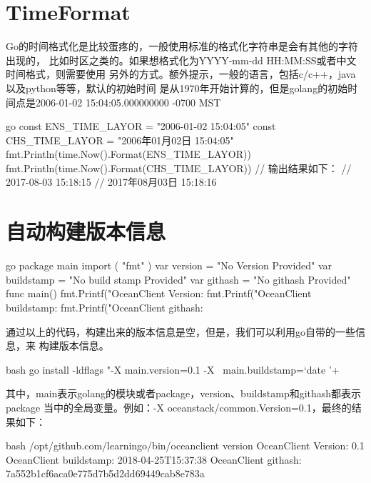 \section{TimeFormat}
Go的时间格式化是比较蛋疼的，一般使用标准的格式化字符串是会有其他的字符出现的，
比如时区之类的。如果想格式化为YYYY-mm-dd HH:MM:SS或者中文时间格式，则需要使用
另外的方式。额外提示，一般的语言，包括c/c++，java以及python等等，默认的初始时间
是从1970年开始计算的，但是golang的初始时间点是2006-01-02 15:04:05.000000000 -0700 MST
\begin{code-block}{go}
const ENS_TIME_LAYOR = "2006-01-02 15:04:05"
const CHS_TIME_LAYOR = "2006年01月02日 15:04:05"
fmt.Println(time.Now().Format(ENS_TIME_LAYOR))
fmt.Println(time.Now().Format(CHS_TIME_LAYOR))
// 输出结果如下：
// 2017-08-03 15:18:15
// 2017年08月03日 15:18:16
\end{code-block}

\section{自动构建版本信息}
\begin{code-block}{go}
package main
import (
    "fmt"
)
var version = "No Version Provided"
var buildstamp = "No build stamp Provided"
var githash = "No githash Provided"
func main() {
    fmt.Printf("OceanClient Version: %
    fmt.Printf("OceanClient buildstamp: %
    fmt.Printf("OceanClient githash: %
}
\end{code-block}

通过以上的代码，构建出来的版本信息是空，但是，我们可以利用go自带的一些信息，来
构建版本信息。
\begin{code-block}{bash}
go install -ldflags "-X main.version=0.1 -X \
    main.buildstamp=`date '+%
\end{code-block}
其中，main表示golang的模块或者package，version、buildstamp和githash都表示package
当中的全局变量。例如：-X oceanstack/common.Version=0.1，最终的结果如下：
\begin{code-block}{bash}
/opt/github.com/learningo/bin/oceanclient version
OceanClient Version: 0.1
OceanClient buildstamp: 2018-04-25T15:37:38
OceanClient githash: 7a552b1cf6aca0e775d7b5d2dd69449cab8e783a
\end{code-block}
